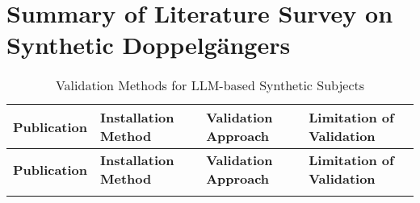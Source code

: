 \chapter{Summary of Literature Survey on Synthetic Doppelgängers}

{ %
\begin{longtable}{| L{4.5cm} | L{3.5cm} | L{3.5cm} | L{3.5cm} |}

\caption{Validation Methods for LLM-based Synthetic Subjects}
\label{tab:llm_validation}\\

\hline
{}
\textbf{Publication} & \textbf{Installation Method} & \textbf{Validation Approach} & \textbf{Limitation of Validation}\\
\hline
\endfirsthead

\hline
{}
\textbf{Publication} & \textbf{Installation Method} & \textbf{Validation Approach} & \textbf{Limitation of Validation}\\
\hline
\endhead

\endfoot

\endlastfoot


\end{longtable}}
